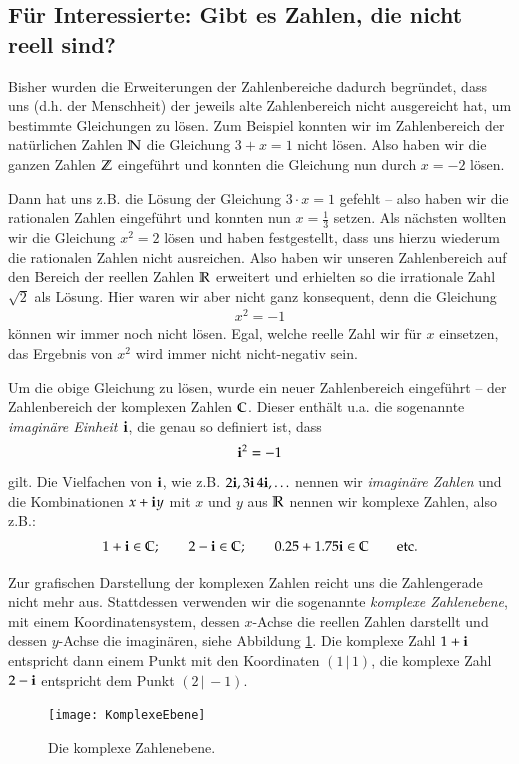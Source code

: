 \subsection{Für Interessierte: Gibt es Zahlen, die nicht reell sind?}
Bisher wurden die Erweiterungen der Zahlenbereiche dadurch begründet, dass uns (d.h. der Menschheit) der jeweils alte Zahlenbereich nicht ausgereicht hat, um bestimmte Gleichungen zu lösen.
Zum Beispiel konnten wir im Zahlenbereich der natürlichen Zahlen $\mathbb{N}$ die Gleichung $3 + x = 1$ nicht lösen.
Also haben wir die ganzen Zahlen $\mathbb{Z}$ eingeführt und konnten die Gleichung nun durch $x = -2$ lösen.

Dann hat uns z.B. die Lösung der Gleichung $3\cdot x = 1$ gefehlt -- also haben wir die rationalen Zahlen eingeführt und konnten nun $x = \frac{1}{3}$ setzen.
Als nächsten wollten wir die Gleichung $x^2 = 2$ lösen und haben festgestellt, dass uns hierzu wiederum die rationalen Zahlen nicht ausreichen.
Also haben wir unseren Zahlenbereich auf den Bereich der reellen Zahlen $\mathbb{R}$ erweitert und erhielten so die irrationale Zahl $\sqrt{2}$ als Lösung.
Hier waren wir aber nicht ganz konsequent, denn die Gleichung
\begin{align*}
	x^2 = -1
\end{align*}
können wir immer noch nicht lösen.
Egal, welche reelle Zahl wir für $x$ einsetzen, das Ergebnis von $x^2$ wird immer nicht nicht-negativ sein.

Um die obige Gleichung zu lösen, wurde ein neuer Zahlenbereich eingeführt -- der Zahlenbereich der komplexen Zahlen $\mathbb{C}$.
Dieser enthält u.a. die sogenannte \emph{imaginäre Einheit $\mathbf{i}$}, die genau so definiert ist, dass
\begin{align*}
	\mathbf{i}^2 = -1
\end{align*}
gilt.
Die Vielfachen von $\mathbf{i}$, wie z.B. $2\mathbf{i}, 3\mathbf{i}\, 4\mathbf{i}, \ldots$ nennen wir \emph{imaginäre Zahlen} und die Kombinationen $x + \mathbf{i} y$ mit $x$ und $y$ aus $\mathbb{R}$ nennen wir komplexe Zahlen, also z.B.:
\begin{align*}
	1 + \mathbf{i} \in \mathbb{C};\qquad 2 - \mathbf{i} \in \mathbb{C};\qquad 0.25 + 1.75\mathbf{i} \in \mathbb{C} \qquad \text{etc.}
\end{align*}

Zur grafischen Darstellung der komplexen Zahlen reicht uns die Zahlengerade nicht mehr aus.
Stattdessen verwenden wir die sogenannte \emph{komplexe Zahlenebene}, mit einem Koordinatensystem, dessen $x$-Achse die reellen Zahlen darstellt und dessen $y$-Achse die imaginären, siehe Abbildung \ref{fig:complexPlain}.
Die komplexe Zahl $1 + \mathbf{i}$ entspricht dann einem Punkt mit den Koordinaten $(1\,|\,1)$, die komplexe Zahl $2 - \mathbf{i}$ entspricht dem Punkt $(2\,|\,-1)$.
\begin{figure}[H]
	\centering
	\texttt{[image: KomplexeEbene]}
	\caption{Die komplexe Zahlenebene.}
	\label{fig:complexPlain}
\end{figure}



